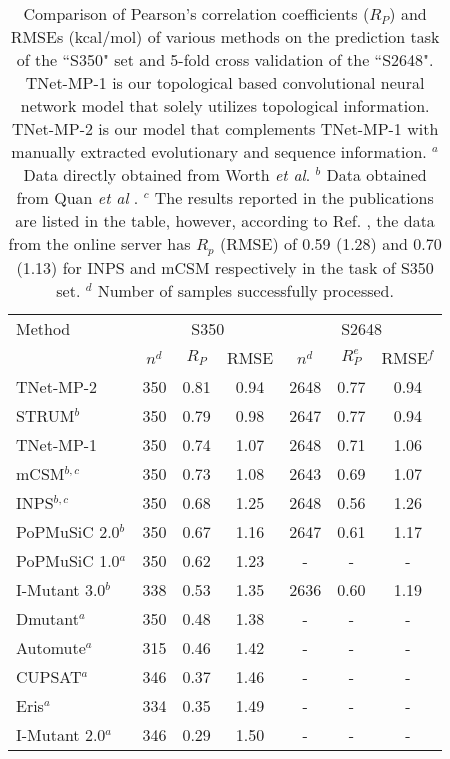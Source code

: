 \documentclass[10pt]{article}
\newcommand\MutTestPCCMedian{0.74} %
\newcommand\MutTestRMSEMedian{1.07}
\newcommand\MutTestSeqPCCMedian{0.81} %
\newcommand\MutTestSeqRMSEMedian{0.94}
\newcommand\MutCVPCCMedian{0.71}
\newcommand\MutCVRMSEMedian{1.06}
\newcommand\MutCVSeqPCCMedian{0.77}
\newcommand\MutCVSeqRMSEMedian{0.94}
\begin{document}
\begin{table}[ht]
\centering
{}
\begin{tabular}{lcccccc}
\toprule
\rowcolor{gray!75}
Method & \multicolumn{3}{c}{S350} & \multicolumn{3}{c}{S2648} \\
\rowcolor{gray!75}
 & $n^d$ & $R_P$ & RMSE  & $n^d$ & $R_P^e$ & RMSE$^f$ \\
\midrule
 TNet-MP-2 & 350 & \MutTestSeqPCCMedian & \MutTestSeqRMSEMedian & 2648 & \MutCVSeqPCCMedian & \MutCVSeqRMSEMedian\\
 STRUM$^b$        & 350 & 0.79 & 0.98 & 2647 & 0.77 & 0.94 \\
  TNet-MP-1 & 350 & \MutTestPCCMedian & \MutTestRMSEMedian & 2648 & \MutCVPCCMedian & \MutCVRMSEMedian\\
 mCSM$^{b,c}$     & 350 & 0.73 & 1.08 & 2643 & 0.69 & 1.07 \\
 INPS$^{b,c}$     & 350 & 0.68 & 1.25 & 2648 & 0.56 & 1.26 \\
 PoPMuSiC 2.0$^b$ & 350 & 0.67 & 1.16 & 2647 & 0.61 & 1.17 \\
 PoPMuSiC 1.0$^a$ & 350 & 0.62 & 1.23 & - & - & - \\
 I-Mutant 3.0$^b$ & 338 & 0.53 & 1.35 & 2636 & 0.60 & 1.19 \\
 Dmutant$^a$      & 350 & 0.48 & 1.38 & - & - & - \\ 
 Automute$^a$     & 315 & 0.46 & 1.42 & - & - & - \\
 CUPSAT$^a$       & 346 & 0.37 & 1.46 & - & - & - \\
 Eris$^a$         & 334 & 0.35 & 1.49 & - & - &  - \\
 I-Mutant 2.0$^a$ & 346 & 0.29 & 1.50 & - & - & - \\
\bottomrule
\end{tabular}
\caption{Comparison of  Pearson's correlation coefficients ($R_P$) and RMSEs (kcal/mol) of various methods on the prediction task of  the ``S350" set and 5-fold cross validation of the ``S2648". TNet-MP-1 is our topological based convolutional neural network model that solely utilizes topological information. TNet-MP-2 is our model that complements TNet-MP-1 with  manually extracted evolutionary and sequence information. $^a$ Data directly obtained from Worth \emph{et al}\cite{Worth:2011}. $^b$ Data obtained from Quan \emph{et al} \cite{LJQuan:2016}. $^c$ The results reported in the publications are listed in the table, however, according to Ref. \cite{LJQuan:2016},  the data from the online server has $R_p$ (RMSE) of 0.59 (1.28) and 0.70 (1.13) for INPS and mCSM respectively in the task of S350 set. $^d$ Number of samples successfully processed.  }
\label{tab:MutationPerformance}
\end{table}
\end{document}
